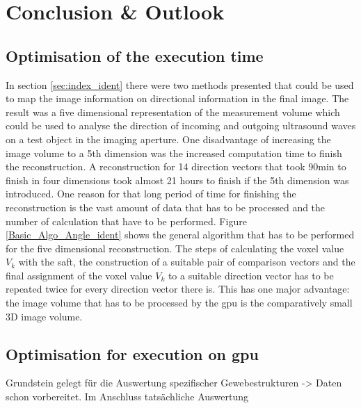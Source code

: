 \chapter{Conclusion \& Outlook}
\label{chap:conclusion}

\section{Optimisation of the execution time}
\label{chap:optimization_runtime}
In section \ref{sec:index_ident} there were two methods presented that could be used to map the image information on directional information in the final image. The result was a five dimensional representation of the measurement volume which could be used to analyse the direction of incoming and outgoing ultrasound waves on a test object in the imaging aperture.
One disadvantage of increasing the image volume to a 5th dimension was the increased computation time to finish the reconstruction. A reconstruction for 14 direction vectors that took 90min to finish in four dimensions took almost 21 hours to finish if the 5th dimension was introduced. One reason for that long period of time for finishing the reconstruction is the vast amount of data that has to be processed and the number of calculation that have to be performed. Figure \ref{Basic_Algo_Angle_ident} shows the general algorithm that has to be performed for the five dimensional reconstruction. The steps of calculating the voxel value $V_k$ with the \ac{saft}, the construction of a suitable pair of comparison vectors and the final assignment of the voxel value $V_k$ to a suitable direction vector has to be repeated twice for every direction vector there is. This has one major advantage: the image volume that has to be processed by the \ac{gpu} is the comparatively small 3D image volume. 



\section{Optimisation for execution on \ac{gpu} }


Grundstein gelegt für die Auswertung spezifischer Gewebestrukturen -> Daten schon vorbereitet. Im Anschluss tatsächliche Auswertung